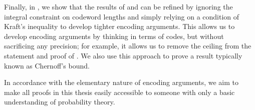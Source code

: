 Finally, in , we show that the results of  and
 can be refined by ignoring the integral constraint on
codeword lengths and simply relying on a condition of Kraft's
inequality to develop tighter encoding arguments. This allows us to
develop encoding arguments by thinking in terms of codes, but without
sacrificing any precision; for example, it allows us to remove the
ceiling from the statement and proof of . We also
use this approach to prove a result typically known as Chernoff's
bound.



In accordance with the elementary nature of encoding arguments, we aim
to make all proofs in this thesis easily accessible to someone with
only a basic understanding of probability theory.




